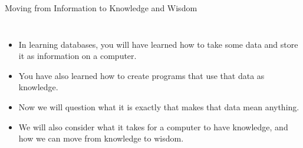 \documentclass[aspectratio=169]{beamer} %
\begin{document}
\begin{frame}{Moving from Information to Knowledge and Wisdom}
\begin{columns}



\begin{itemize}
  \item In learning databases, you will have learned how to take some data and store it as information on a computer.
  \item You have also learned how to create programs that use that data as knowledge.
  \item Now we will question what it is exactly that makes that data mean anything.
  \item We will also consider what it takes for a computer to have knowledge, and how we can move from knowledge to wisdom.
\end{itemize}

\end{columns}

\end{frame}
\end{document}
